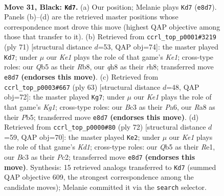 \documentclass[11pt]{article}
\begin{document}
\clearpage

\begin{figure}[p]\centering
\begin{subfigure}{0.46\textwidth}\centering
\resizebox{\linewidth}{!}{%
\newchessgame
\chessboard[
  setfen={r3k2Q/p7/4p3/pq1p4/2rP2P1/2b5/2P5/3K2R1 b - - 4 31},
  showmover=false,
  pgfstyle=straightmove, color=movearrow, markmove={e8-d7}
]}
\caption{}
\end{subfigure}\hfill
\begin{subfigure}{0.46\textwidth}\centering
\resizebox{\linewidth}{!}{%
\newchessgame
\chessboard[
  setfen={1r2k2R/1q3pp1/5b2/4pP2/8/Q7/1PP1B3/1K6 b - - 6 36},
  showmover=false,
  pgfstyle=straightmove, color=movearrow, markmove={e8-d7}
]}
\caption{}
\end{subfigure}
\\[4pt]
\begin{subfigure}{0.46\textwidth}\centering
\resizebox{\linewidth}{!}{%
\newchessgame
\chessboard[
  setfen={3Q2k1/4r2p/p3q1p1/1p6/8/7P/P4PP1/2R3K1 b - - 3 32},
  showmover=false,
  pgfstyle=straightmove, color=movearrow, markmove={g8-g7}
]}
\caption{}
\end{subfigure}\hfill
\begin{subfigure}{0.46\textwidth}\centering
\resizebox{\linewidth}{!}{%
\newchessgame
\chessboard[
  setfen={1r4k1/p6p/5Qp1/3p4/1p1P3P/8/2P2P2/q2KR2R w - - 6 37},
  showmover=false,
  pgfstyle=straightmove, color=movearrow, markmove={d1-e2}
]}
\caption{}
\end{subfigure}
\caption{\textbf{Move 31, Black: \texttt{Kd7}.} (a) Our position; Melanie plays \texttt{Kd7} (\texttt{e8d7}). Panels (b)--(d) are the retrieved master positions whose correspondence most drove this move (highest QAP objective among those that transfer to it). (b) Retrieved from \texttt{ccrl\_top\_p0001\#3219} (ply 71) [structural distance $d$=53, QAP obj=74]: the master played \texttt{Kd7}; under $\mu$ our \emph{Ke1} plays the role of that game's \emph{Ke1}; cross-type roles: our \emph{Q}b5 as their \emph{R}b8, our \emph{q}h8 as their \emph{r}h8; transferred move \texttt{e8d7} \textbf{(endorses this move)}. (c) Retrieved from \texttt{ccrl\_top\_p0003\#667} (ply 63) [structural distance $d$=48, QAP obj=72]: the master played \texttt{Kg7}; under $\mu$ our \emph{Ke1} plays the role of that game's \emph{Kg1}; cross-type roles: our \emph{B}c3 as their \emph{P}a6, our \emph{R}a8 as their \emph{P}b5; transferred move \texttt{e8d7} \textbf{(endorses this move)}. (d) Retrieved from \texttt{ccrl\_top\_p0000\#80} (ply 72) [structural distance $d$=59, QAP obj=70]: the master played \texttt{Ke2}; under $\mu$ our \emph{Ke1} plays the role of that game's \emph{Kd1}; cross-type roles: our \emph{Q}b5 as their \emph{R}e1, our \emph{B}c3 as their \emph{P}c2; transferred move \texttt{e8d7} \textbf{(endorses this move)}. Synthesis: 15 retrieved analogs transferred to \texttt{Kd7} (summed QAP objective 609, the strongest correspondence among the candidate moves); Melanie committed it via the \texttt{search} selector.}
\label{fig:thought-m61}
\end{figure}
\end{document}
